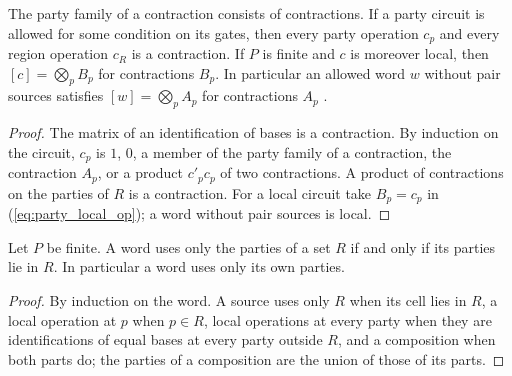 \begin{theorem}
    \label{thm:party_local_contraction}
    \leanok
    The party family of a contraction consists of contractions. If a party circuit
    is allowed for some condition on its gates, then every party operation $c_p$ and
    every region operation $c_R$ is a contraction. If $P$ is finite and $c$ is moreover
    local, then $[c]=\bigotimes_pB_p$ for contractions $B_p$. In particular an
    allowed word $w$ without pair sources satisfies $[w]=\bigotimes_pA_p$ for
    contractions $A_p$ \cite[Theorem~5.2]{OpenAI2026PolynomialPEPS}.
\end{theorem}
\begin{proof}\leanok
    The matrix of an identification of bases is a contraction. By induction on
    the circuit, $c_p$ is $1$, $0$, a member of the party family of a contraction,
    the contraction $A_p$, or a product $c'_pc_p$ of two contractions. A product of
    contractions on the parties of $R$ is a contraction. For a local circuit take
    $B_p=c_p$ in (\ref{eq:party_local_op}); a word without pair sources is local.
\end{proof}

\begin{theorem}
    \label{thm:party_parties}
    \leanok
    Let $P$ be finite. A word uses only the parties of a set $R$ if and only if its
    parties lie in $R$. In particular a word uses only its own parties.
\end{theorem}
\begin{proof}\leanok
    By induction on the word. A source uses only $R$ when its cell lies in $R$, a
    local operation at $p$ when $p\in R$, local operations at every party when they
    are identifications of equal bases at every party outside $R$, and a
    composition when both parts do; the parties of a composition are the union of
    those of its parts.
\end{proof}

